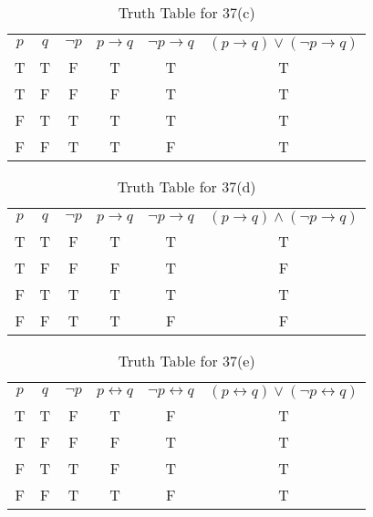 \documentclass{Axon}
\begin{document}
\begin{table}[ht]
    \centering
    \begin{tabular}{c|c|c|c|c|c}
        \(p\) & \(q\) & \(\lnot p\) & \(p \to q\) & \(\lnot p \to q\) & \((p \to q) \lor (\lnot p \to q)\) \\
        T     & T     & F           & T           & T                 & T                                  \\
        T     & F     & F           & F           & T                 & T                                  \\
        F     & T     & T           & T           & T                 & T                                  \\
        F     & F     & T           & T           & F                 & T
    \end{tabular}
    \caption{Truth Table for 37(c)}
\end{table}

\begin{table}[ht]
    \centering
    \begin{tabular}{c|c|c|c|c|c}
        \(p\) & \(q\) & \(\lnot p\) & \(p \to q\) & \(\lnot p \to q\) & \((p \to q) \land (\lnot p \to q)\) \\
        T     & T     & F           & T           & T                 & T                                   \\
        T     & F     & F           & F           & T                 & F                                   \\
        F     & T     & T           & T           & T                 & T                                   \\
        F     & F     & T           & T           & F                 & F
        \end{tabular}
    \caption{Truth Table for 37(d)}
\end{table}

\begin{table}[ht]
    \centering
    \begin{tabular}{c|c|c|c|c|c}
        \(p\) & \(q\) & \(\lnot p\) & \(p \leftrightarrow q\) & \(\lnot p \leftrightarrow q\) & \((p \leftrightarrow q) \lor (\lnot p \leftrightarrow q)\) \\
        T     & T     & F           & T                       & F                             & T                                                          \\
        T     & F     & F           & F                       & T                             & T                                                          \\
        F     & T     & T           & F                       & T                             & T                                                          \\
        F     & F     & T           & T                       & F                             & T
    \end{tabular}
    \caption{Truth Table for 37(e)}
\end{table}
\end{document}
